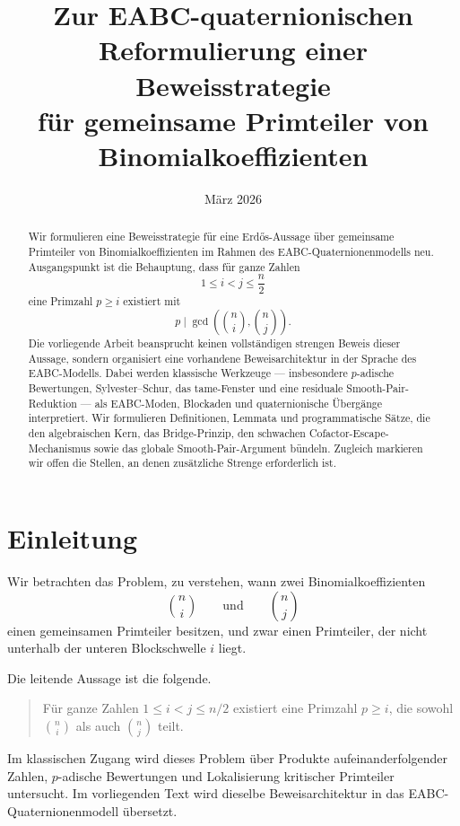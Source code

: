 \documentclass[12pt,a4paper]{article}
\title{Zur EABC-quaternionischen Reformulierung einer Beweisstrategie\\
	für gemeinsame Primteiler von Binomialkoeffizienten}
\author{}
\date{März 2026}
\theoremstyle{plain}
\theoremstyle{definition}
\theoremstyle{remark}
\begin{document}
	
	\maketitle
	
	\begin{abstract}
		Wir formulieren eine Beweisstrategie für eine Erdős-Aussage über gemeinsame Primteiler von Binomialkoeffizienten im Rahmen des EABC-Quaternionenmodells neu. Ausgangspunkt ist die Behauptung, dass für ganze Zahlen
		\[
		1\le i<j\le \frac{n}{2}
		\]
		eine Primzahl \(p\ge i\) existiert mit
		\[
		p \mid \gcd\!\left(\binom{n}{i},\binom{n}{j}\right).
		\]
		Die vorliegende Arbeit beansprucht keinen vollständigen strengen Beweis dieser Aussage, sondern organisiert eine vorhandene Beweisarchitektur in der Sprache des EABC-Modells. Dabei werden klassische Werkzeuge --- insbesondere \(p\)-adische Bewertungen, Sylvester--Schur, das tame-Fenster und eine residuale Smooth-Pair-Reduktion --- als EABC-Moden, Blockaden und quaternionische Übergänge interpretiert. Wir formulieren Definitionen, Lemmata und programmatische Sätze, die den algebraischen Kern, das Bridge-Prinzip, den schwachen Cofactor-Escape-Mechanismus sowie das globale Smooth-Pair-Argument bündeln. Zugleich markieren wir offen die Stellen, an denen zusätzliche Strenge erforderlich ist.
	\end{abstract}
	
	\tableofcontents
	
	\section{Einleitung}
	
	Wir betrachten das Problem, zu verstehen, wann zwei Binomialkoeffizienten
	\[
	\binom{n}{i}
	\qquad\text{und}\qquad
	\binom{n}{j}
	\]
	einen gemeinsamen Primteiler besitzen, und zwar einen Primteiler, der nicht unterhalb der unteren Blockschwelle \(i\) liegt.
	
	Die leitende Aussage ist die folgende.
	
	\begin{quote}
		Für ganze Zahlen \(1\le i<j\le n/2\) existiert eine Primzahl \(p\ge i\), die sowohl \(\binom{n}{i}\) als auch \(\binom{n}{j}\) teilt.
	\end{quote}
	
	Im klassischen Zugang wird dieses Problem über Produkte aufeinanderfolgender Zahlen, \(p\)-adische Bewertungen und Lokalisierung kritischer Primteiler untersucht. Im vorliegenden Text wird dieselbe Beweisarchitektur in das EABC-Quaternionenmodell übersetzt.
	
\end{document}
